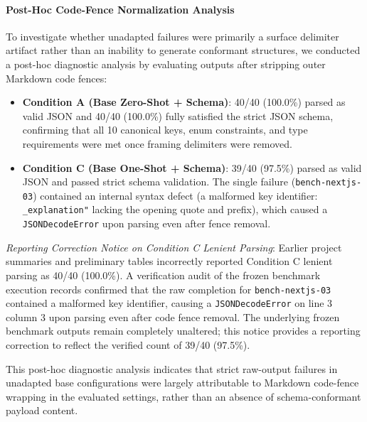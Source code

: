 \documentclass[11pt,a4paper]{article}
\begin{document}
\paragraph{Post-Hoc Code-Fence Normalization Analysis}
To investigate whether unadapted failures were primarily a surface delimiter artifact rather than an inability to generate conformant structures, we conducted a post-hoc diagnostic analysis by evaluating outputs after stripping outer Markdown code fences:
\begin{itemize}
    \item \textbf{Condition A (Base Zero-Shot + Schema)}: 40/40 (100.0\%) parsed as valid JSON and 40/40 (100.0\%) fully satisfied the strict JSON schema, confirming that all 10 canonical keys, enum constraints, and type requirements were met once framing delimiters were removed.
    \item \textbf{Condition C (Base One-Shot + Schema)}: 39/40 (97.5\%) parsed as valid JSON and passed strict schema validation. The single failure (\texttt{bench-nextjs-03}) contained an internal syntax defect (a malformed key identifier: \texttt{\_explanation"} lacking the opening quote and prefix), which caused a \texttt{JSONDecodeError} upon parsing even after fence removal.
\end{itemize}
\textit{Reporting Correction Notice on Condition C Lenient Parsing}: Earlier project summaries and preliminary tables incorrectly reported Condition C lenient parsing as 40/40 (100.0\%). A verification audit of the frozen benchmark execution records confirmed that the raw completion for \texttt{bench-nextjs-03} contained a malformed key identifier, causing a \texttt{JSONDecodeError} on line 3 column 3 upon parsing even after code fence removal. The underlying frozen benchmark outputs remain completely unaltered; this notice provides a reporting correction to reflect the verified count of 39/40 (97.5\%).

This post-hoc diagnostic analysis indicates that strict raw-output failures in unadapted base configurations were largely attributable to Markdown code-fence wrapping in the evaluated settings, rather than an absence of schema-conformant payload content.
\end{document}
